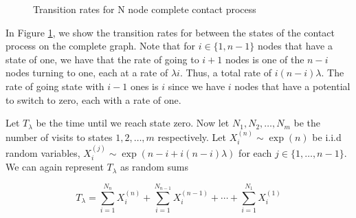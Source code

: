 \documentclass{article}
\theoremstyle{plain}
\theoremstyle{definition}
\theoremstyle{remark}
\numberwithin{equation}{section}
\begin{document}
\begin{figure}
    \centering
    \caption{Transition rates for N node complete contact process}
    \label{fig:complete_contact_n_node_rates}
\end{figure}

In Figure \ref{fig:complete_contact_n_node_rates}, we show the transition rates for between the states of the contact process on the complete graph.
Note that for $i \in \{1, n - 1\} $ nodes that have a state of one, we have that the rate of going to $i + 1$ nodes is one of the $n - i$ nodes turning to one, each at a rate of $\lambda i$.
Thus, a total rate of $i (n - i) \lambda$.
The rate of going state with $i - 1$ ones is $i$ since we have $i$ nodes that have a potential to switch to zero, each with a rate of one.

Let $T_\lambda$ be the time until we reach state zero.
Now let $N_1, N_2, \ldots, N_m$ be the number of visits to states $1, 2, \ldots, m$ respectively.
Let $X_i^{(n)} \sim \exp(n)$ be i.i.d random variables, $X_i^{(j)} \sim \exp(n - i + i(n - i)\lambda)$ for each $j \in \{1, \ldots, n-1\}$.
We can again represent $T_\lambda$ as random sums

\begin{equation}\label{eq:wait_contact_sum}
    T_\lambda = \sum_{i = 1}^{N_n} X_i^{(n)} + \sum_{i = 1}^{N_{n - 1}} X_i^{(n - 1)} + \cdots + \sum_{i = 1}^{N_1} X_i^{(1)}
\end{equation}
\end{document}
